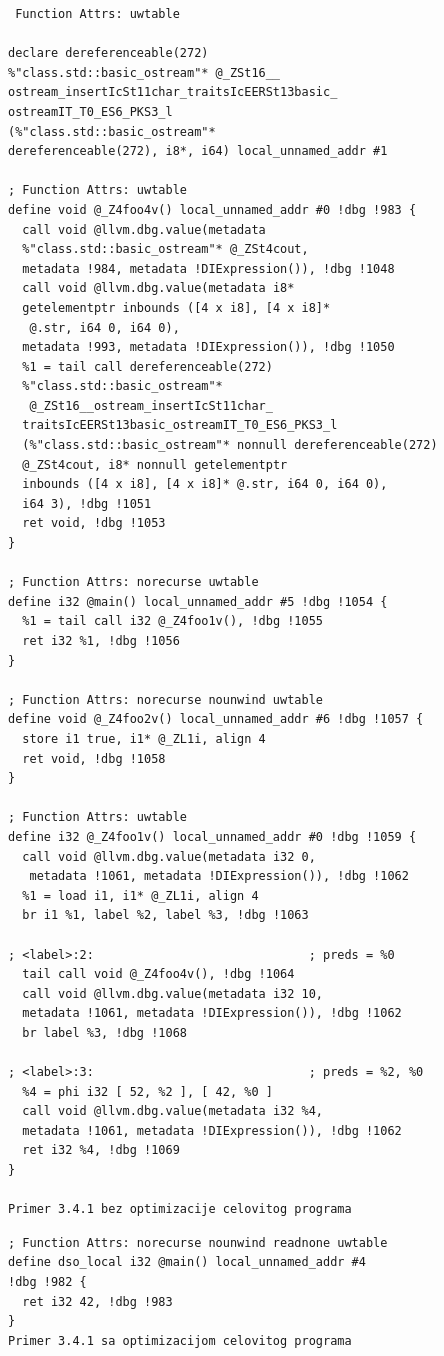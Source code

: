 \documentclass[12pt,oneside]{memoir}
\begin{document}
\begin{lstlisting}
 Function Attrs: uwtable

declare dereferenceable(272) 
%"class.std::basic_ostream"* @_ZSt16__
ostream_insertIcSt11char_traitsIcEERSt13basic_
ostreamIT_T0_ES6_PKS3_l
(%"class.std::basic_ostream"* 
dereferenceable(272), i8*, i64) local_unnamed_addr #1

; Function Attrs: uwtable
define void @_Z4foo4v() local_unnamed_addr #0 !dbg !983 {
  call void @llvm.dbg.value(metadata 
  %"class.std::basic_ostream"* @_ZSt4cout, 
  metadata !984, metadata !DIExpression()), !dbg !1048
  call void @llvm.dbg.value(metadata i8* 
  getelementptr inbounds ([4 x i8], [4 x i8]*
   @.str, i64 0, i64 0), 
  metadata !993, metadata !DIExpression()), !dbg !1050
  %1 = tail call dereferenceable(272) 
  %"class.std::basic_ostream"*
   @_ZSt16__ostream_insertIcSt11char_
  traitsIcEERSt13basic_ostreamIT_T0_ES6_PKS3_l
  (%"class.std::basic_ostream"* nonnull dereferenceable(272) 
  @_ZSt4cout, i8* nonnull getelementptr 
  inbounds ([4 x i8], [4 x i8]* @.str, i64 0, i64 0), 
  i64 3), !dbg !1051
  ret void, !dbg !1053
}

; Function Attrs: norecurse uwtable
define i32 @main() local_unnamed_addr #5 !dbg !1054 {
  %1 = tail call i32 @_Z4foo1v(), !dbg !1055
  ret i32 %1, !dbg !1056
}

; Function Attrs: norecurse nounwind uwtable
define void @_Z4foo2v() local_unnamed_addr #6 !dbg !1057 {
  store i1 true, i1* @_ZL1i, align 4
  ret void, !dbg !1058
}

; Function Attrs: uwtable
define i32 @_Z4foo1v() local_unnamed_addr #0 !dbg !1059 {
  call void @llvm.dbg.value(metadata i32 0,
   metadata !1061, metadata !DIExpression()), !dbg !1062
  %1 = load i1, i1* @_ZL1i, align 4
  br i1 %1, label %2, label %3, !dbg !1063

; <label>:2:                              ; preds = %0
  tail call void @_Z4foo4v(), !dbg !1064
  call void @llvm.dbg.value(metadata i32 10, 
  metadata !1061, metadata !DIExpression()), !dbg !1062
  br label %3, !dbg !1068

; <label>:3:                              ; preds = %2, %0
  %4 = phi i32 [ 52, %2 ], [ 42, %0 ]
  call void @llvm.dbg.value(metadata i32 %4, 
  metadata !1061, metadata !DIExpression()), !dbg !1062
  ret i32 %4, !dbg !1069
}

Primer 3.4.1 bez optimizacije celovitog programa
\end{lstlisting}


\begin{lstlisting}
; Function Attrs: norecurse nounwind readnone uwtable
define dso_local i32 @main() local_unnamed_addr #4 
!dbg !982 {
  ret i32 42, !dbg !983
}
Primer 3.4.1 sa optimizacijom celovitog programa
\end{lstlisting}
\end{document}
